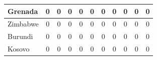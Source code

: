\documentclass[12pt]{article}  %
\begin{document}
\begin{subappendices}
\begin{longtable}{|l|c|c|c|c|c|c|c|c|c|c|}
	\hline
	Grenada                                                        & 0                                                                      & 0                                                                      & 0                                                                      & 0                                                                      & 0                                                                      & 0                                                                      & 0                         & 0                           & 0                           & 0                           \\ 
	\hline
	Zimbabwe                                                       & 0                                                                      & 0                                                                      & 0                                                                      & 0                                                                      & 0                                                                      & 0                                                                      & 0                         & 0                           & 0                           & 0                           \\ 
	\hline
	Burundi                                                        & 0                                                                      & 0                                                                      & 0                                                                      & 0                                                                      & 0                                                                      & 0                                                                      & 0                         & 0                           & 0                           & 0                           \\ 
	\hline
	Kosovo                                                         & 0                                                                      & 0                                                                      & 0                                                                      & 0                                                                      & 0                                                                      & 0                                                                      & 0                         & 0                           & 0                           & 0                           \\
	\hline
\end{longtable}




\end{subappendices}
\end{document}
